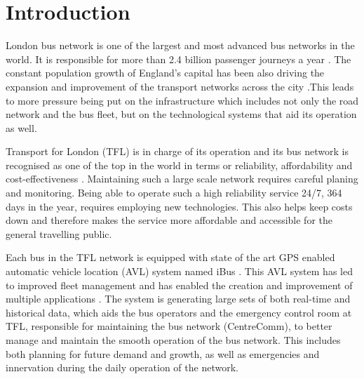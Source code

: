 \chapter{Introduction}
London bus network is one of the largest and most advanced bus networks in the world. It is responsible for more than 2.4 billion passenger journeys a year \cite{TFL1}. The constant population growth of England's capital has been also driving the expansion and improvement of the transport networks across the city \cite{TFL2}.This leads to more pressure being put on the infrastructure which includes not only the road network and the bus fleet, but on the technological systems that aid its operation as well.

Transport for London (TFL) is in charge of its operation and its bus network is recognised as one of the top in the world in terms or reliability, affordability and cost-effectiveness \cite{TFL1}. Maintaining such a large scale network requires careful planing and monitoring. Being able to operate such a high reliability service 24/7, 364 days in the year, requires employing new technologies. This also helps keep costs down and therefore makes the service more affordable and accessible for the general travelling public. 

Each bus in the TFL network is equipped with state of the art GPS enabled automatic vehicle location (AVL) system named iBus \cite{ibusdeployment}. This AVL system has led to improved fleet management and has enabled the creation and improvement of multiple applications \cite{eps354267}. The system is generating large sets of both real-time and historical data, which aids the bus operators and the emergency control room at TFL, responsible for maintaining the bus network (CentreComm), to better manage and maintain the smooth operation of the bus network. This includes both planning for future demand and growth, as well as emergencies and innervation during the daily operation of the network. 

